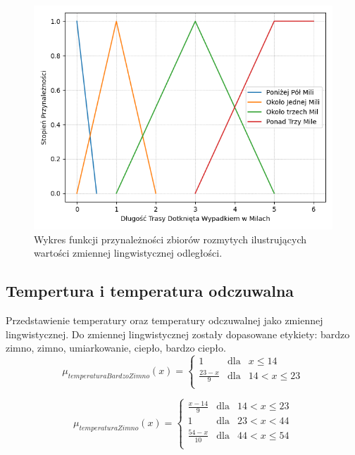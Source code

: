 \documentclass{classrep}
\begin{document}
\begin{figure}[h!]
 \centering
 \includegraphics[width=14cm]{FunkcjaPrzynaleznosciOdleglosc.png}
 \vspace{-0.3cm}
 \caption{Wykres funkcji przynależności zbiorów rozmytych ilustrujących wartości zmiennej lingwistycznej odległości. }
 \label{rysunek do eksperymentu 1 wariantu 1}
\end{figure}
\newpage

\subsection{Tempertura i temperatura odczuwalna}
Przedstawienie temperatury oraz temperatury odczuwalnej jako zmiennej lingwistycznej. Do zmiennej lingwistycznej zostały dopasowane etykiety: bardzo zimno, zimno, umiarkowanie, ciepło, bardzo ciepło. 
\begin{equation}
\mu _{temperaturaBardzoZimno}(x) =  \left\{ \begin{array}{rcl}
 1 & \mbox{dla} & x  \leq 14 \\
\frac{23 - x}{9} & \mbox{dla} & 14 < x \leq 23\\
\end{array}\right.
\end{equation}

\begin{equation}
\mu _{temperaturaZimno}(x) =  \left\{ \begin{array}{rcl}
\frac{x - 14}{9} & \mbox{dla} & 14 < x \leq 23\\
1 & \mbox{dla} & 23 < x < 44\\
\frac{54 - x}{10} & \mbox{dla} & 44 < x \leq 54\\
\end{array}\right.
\end{equation}
\end{document}
